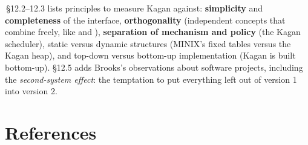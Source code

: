 \documentclass[11pt,a4paper]{article}
\begin{document}
\MOS\,\S12.2--12.3 lists principles to measure Kagan against: \textbf{simplicity} and
\textbf{completeness} of the interface, \textbf{orthogonality} (independent concepts that combine freely, like
 and ), \textbf{separation of mechanism and policy} (the Kagan scheduler), static versus dynamic
structures (MINIX's fixed tables versus the Kagan heap), and top-down versus bottom-up implementation (Kagan is
built bottom-up).
\S12.5 adds Brooks's observations about software projects, including the \emph{second-system effect}: the temptation to
put everything left out of version 1 into version 2.

\section{References}
\end{document}

